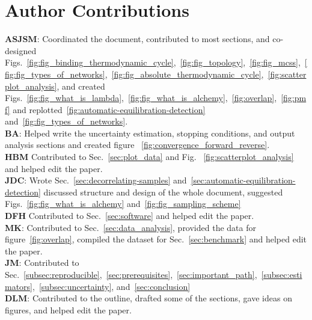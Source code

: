 \documentclass[9pt,bestpractices]{livecoms}
\begin{document}
\section*{Author Contributions}
%
\textbf{ASJSM}: Coordinated the document, contributed to most sections, and co-designed Figs.~\ref{fig:fig_binding_thermodynamic_cycle},~\ref{fig:fig_topology},~\ref{fig:fig_mcss},~\ref{fig:fig_types_of_networks},~\ref{fig:fig_absolute_thermodynamic_cycle},~\ref{fig:scatterplot_analysis}, and created Figs.~\ref{fig:fig_what_is_lambda},~\ref{fig:fig_what_is_alchemy},~\ref{fig:overlap},~\ref{fig:pmf} and replotted~\ref{fig:automatic-equilibration-detection} and~\ref{fig:fig_types_of_networks}.\\
\textbf{BA}: Helped write the uncertainty estimation, stopping conditions, and output analysis sections and created figure ~\ref{fig:convergence_forward_reverse}.\\
\textbf{HBM} Contributed to Sec.~\ref{sec:plot_data} and Fig.~ \ref{fig:scatterplot_analysis} and helped edit the paper.\\
\textbf{JDC}: Wrote Sec.~\ref{sec:decorrelating-samples} and~\ref{sec:automatic-equilibration-detection} discussed structure and design of the whole document, suggested Figs.~\ref{fig:fig_what_is_alchemy} and~\ref{fig:fig_sampling_scheme} \\
\textbf{DFH} Contributed to Sec.~\ref{sec:software} and helped edit the paper. \\
\textbf{MK}: Contributed to Sec.~\ref{sec:data_analysis}, provided the data for figure~\ref{fig:overlap}, compiled the dataset for Sec.~\ref{sec:benchmark} and helped edit the paper.\\
\textbf{JM}: Contributed to Sec.~\ref{subsec:reproducible},~\ref{sec:prerequisites},~\ref{sec:important_path},~\ref{subsec:estimators},~\ref{subsec:uncertainty}, and~\ref{sec:conclusion}\\
\textbf{DLM}: Contributed to the outline, drafted some of the sections, gave ideas on figures, and helped edit the paper.\\
\end{document}
